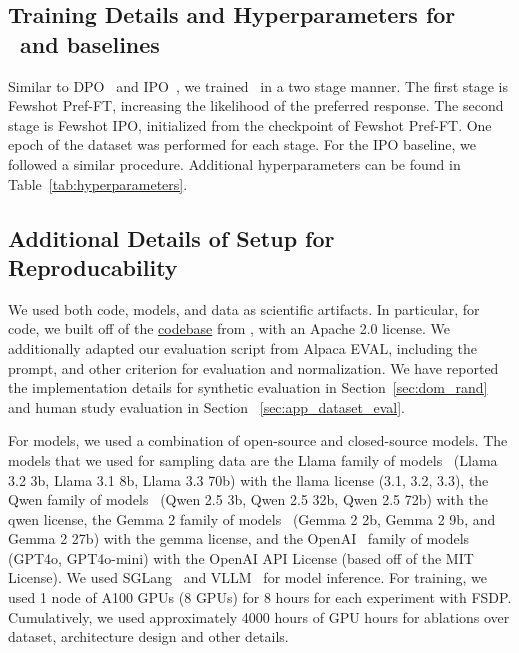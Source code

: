 \subsection{Training Details and Hyperparameters for \methodname\ and baselines}
Similar to DPO~\citep{rafailov2023direct} and IPO~\citep{2023arXiv231012036G}, we trained \methodname\ in a two stage manner. The first stage is Fewshot Pref-FT, increasing the likelihood of the preferred response. The second stage is Fewshot IPO, initialized from the checkpoint of Fewshot Pref-FT. One epoch of the dataset was performed for each stage. For the IPO baseline, we followed a similar procedure. Additional hyperparameters can be found in Table~\ref{tab:hyperparameters}. 

\subsection{Additional Details of Setup for Reproducability}
We used both code, models, and data as scientific artifacts. In particular, for code, we built off of the \href{https://github.com/eric-mitchell/direct-preference-optimization}{codebase} from \citet{rafailov2023direct}, with an Apache 2.0 license. We additionally adapted our evaluation script from Alpaca EVAL, including the prompt, and other criterion for evaluation and normalization. We have reported the implementation details for synthetic evaluation in Section~\ref{sec:dom_rand} and human study evaluation in Section ~\ref{sec:app_dataset_eval}.

For models, we used a combination of open-source and closed-source models. The models that we used for sampling data are the Llama family of models~\citep{grattafiori2024llama} (Llama 3.2 3b, Llama 3.1 8b, Llama 3.3 70b) with the llama license (3.1, 3.2, 3.3), the Qwen family of models~\citep{qwen2025qwen25technicalreport} (Qwen 2.5 3b, Qwen 2.5 32b, Qwen 2.5 72b) with the qwen license, the Gemma 2 family of models~\citep{gemmateam2024gemma2improvingopen} (Gemma 2 2b, Gemma 2 9b, and Gemma 2 27b) with the gemma license, and the OpenAI~\citep{openai2024gpt4ocard} family of models (GPT4o, GPT4o-mini) with the OpenAI API License (based off of the MIT License). We used SGLang~\citep{zheng2024sglangefficientexecutionstructured} and VLLM~\citep{kwon2023efficientmemorymanagementlarge} for model inference. For training, we used 1 node of A100 GPUs (8 GPUs) for 8 hours for each experiment with FSDP. Cumulatively, we used approximately 4000 hours of GPU hours for ablations over dataset, architecture design and other details. 

